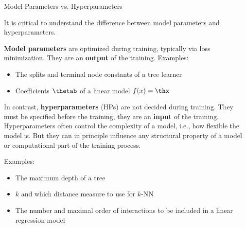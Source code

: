 \begin{vbframe}{Model Parameters vs. Hyperparameters}

It is critical to understand the difference between model parameters and hyperparameters. 

\lz

\textbf{Model parameters} are optimized during training, typically via loss minimization. They are an \textbf{output} of the training. Examples:
\begin{itemize}
\item The splits and terminal node constants of a tree learner 
\item Coefficients $\thetab$ of a linear model $\fx = \thx$
\end{itemize}

\framebreak
  
In contrast, \textbf{hyperparameters} (HPs) are not decided during training. They must be specified before the training, they are an \textbf{input} of the training. 
Hyperparameters often control the complexity of a model, i.e., how flexible the model is.
But they can in principle influence any structural property of a model or computational part of the training process.

\lz

Examples:

\begin{itemize}
\item The maximum depth of a tree 
\item $k$ and which distance measure to use for $k$-NN
\item The number and maximal order of interactions to be included in a linear regression model
\end{itemize}

\end{vbframe}


